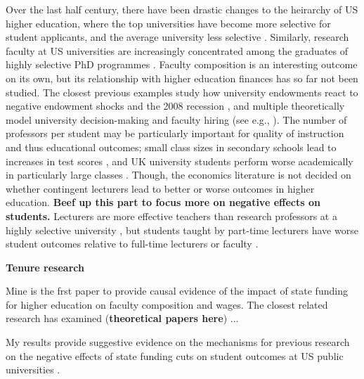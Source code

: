 Over the last half century, there have been drastic changes to the heirarchy of US higher education, where the top universities have become more selective for student applicants, and the average university less selective \citep{hoxby2009changing}.
Similarly, research faculty at US universities are increasingly concentrated among the graduates of highly selective PhD programmes \citep{wapman2022quantifying}.
Faculty composition is an interesting outcome on its own, but its relationship with higher education finances has so far not been studied.
The closest previous examples study  how university endowments react to negative endowment shocks \citep{brown2014endowment} and the 2008 recession \citep{turner2014impact}, and multiple theoretically model university decision-making and faculty hiring (see e.g., \citealt{abe2015implications,johnson2009jep,NBERc13879}).
The number of professors per student may be particularly important for quality of instruction and thus educational outcomes;
small class sizes in secondary schools lead to increases in test scores \citep{angrist1999using}, and UK university students perform worse academically in particularly large classes \citep{bandiera2010heterogeneous}.
Though, the economics literature is not decided on whether contingent lecturers lead to better or worse outcomes in higher education.
\textbf{Beef up this part to focus more on negative effects on students.}
Lecturers are more effective teachers than research professors at a highly selective university \citep{bettinger2010does,figlio2015tenure}, but students taught by part-time lecturers have worse student outcomes relative to full-time lecturers or faculty \citep{zhu2021limited,ehrenberg2005tenured,jaeger2011examining}.

\textbf{Tenure research \citep{mcpherson1999tenure,mcpherson1983economics}}

Mine is the frst paper to provide causal evidence of the impact of state funding for higher education on faculty composition and wages.
The closest related research has examined (\textbf{theoretical papers here}) $\hdots$

My results provide suggestive evidence on the mechanisms for previous research on the negative effects of state funding cuts on student outcomes at US public universities \citep{zhu2021limited,ehrenberg2012american}.

